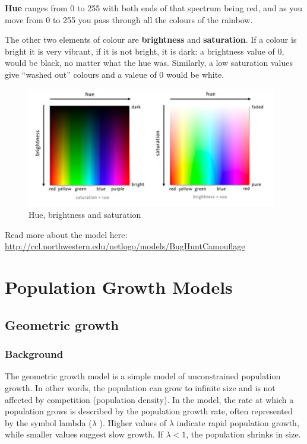 \documentclass[
  a4paper]{book}
\begin{document}
\textbf{Hue} ranges from 0 to 255 with both ends of that spectrum being red, and as you move from 0 to 255 you pass through all the colours of the rainbow.

The other two elements of colour are \textbf{brightness} and \textbf{saturation}. If a colour is bright it is very vibrant, if it is not bright, it is dark: a brightness value of 0, would be black, no matter what the hue was. Similarly, a low saturation values give ``washed out'' colours and a valeue of 0 would be white.

\begin{figure}

{\centering \includegraphics[width=0.5\linewidth]{images/colours} 

}

\caption{Hue, brightness and saturation}\label{fig:colours}
\end{figure}

Read more about the model here: \url{http://ccl.northwestern.edu/netlogo/models/BugHuntCamouflage}

\hypertarget{part-population-growth-models}{%
\part{Population Growth Models}\label{part-population-growth-models}}

\hypertarget{geometric-growth}{%
\chapter{Geometric growth}\label{geometric-growth}}

\hypertarget{background-1}{%
\section{Background}\label{background-1}}

The geometric growth model is a simple model of unconstrained population growth. In other words, the population can grow to infinite size and is not affected by competition (population density). In the model, the rate at which a population grows is described by the population growth rate, often represented by the symbol lambda (\(\lambda\) ). Higher values of \(\lambda\) indicate rapid population growth, while smaller values suggest slow growth. If \(\lambda < 1\), the population shrinks in size.
\end{document}
